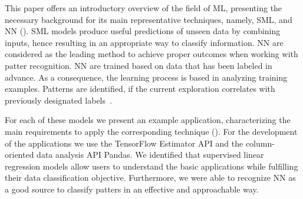 This paper offers an introductory overview of the field of \ac{ML}, presenting the necessary 
background for its main representative techniques, namely, \ac{SML}, and \ac{NN} (). 
\ac{SML} models produce useful predictions of unseen data by combining inputs, hence resulting in 
an appropriate way to classify information. \ac{NN} are considered as the leading method to achieve 
proper outcomes when working with patter recognition. \ac{NN} are trained based on data that has 
been labeled in advance. As a consequence, the learning process is based in analyzing training 
examples. Patterns are identified, if the current exploration  correlates with previously designated 
labels~\cite{mit17}. 

For each of these models we present an example application, characterizing the main 
requirements to apply the corresponding technique (). For the development of the 
applications we use the TensorFlow Estimator API and the column-oriented data analysis API Pandas.
We identified that supervised linear regression models allow users to understand the basic 
applications while fulfilling their data classification objective. Furthermore, we were able to recognize 
\ac{NN} as a good source to classify patters in an effective and approachable way. 


\endinput

